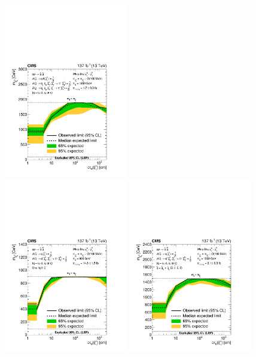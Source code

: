   \begin{figure}[htbp]
    \centering
    \includegraphics[width=0.48\textwidth]{figures/MT2_2019/Figure_020-a}\\
    \includegraphics[width=0.48\textwidth]{figures/MT2_2019/Figure_020-b}
    \includegraphics[width=0.48\textwidth]{figures/MT2_2019/Figure_020-c}

\end{figure}
